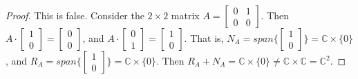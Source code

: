 \documentclass[11pt]{article}
\theoremstyle{quest}
\begin{document}
\begin{proof}
This is false. Consider the $2 \times 2$ matrix $A = \begin{bmatrix} 0 & 1 \\ 0 & 0 \end{bmatrix}$. Then $A \cdot \begin{bmatrix} 1\\ 0 \end{bmatrix} = \begin{bmatrix} 0\\ 0 \end{bmatrix}$, and $A \cdot \begin{bmatrix} 0\\ 1 \end{bmatrix} = \begin{bmatrix} 1\\ 0 \end{bmatrix}$. That is, $N_A = span\Big\{\begin{bmatrix} 1\\ 0 \end{bmatrix}\Big\} = \mathbb{C} \times \{0\}$, and $R_A = span\Big\{\begin{bmatrix} 1\\ 0 \end{bmatrix}\Big\} = \mathbb{C} \times \{0\}$. Then $R_A + N_A = \mathbb{C} \times \{0\} \ne \mathbb{C} \times \mathbb{C} = \mathbb{C}^2$.
\end{proof}
\end{document}
